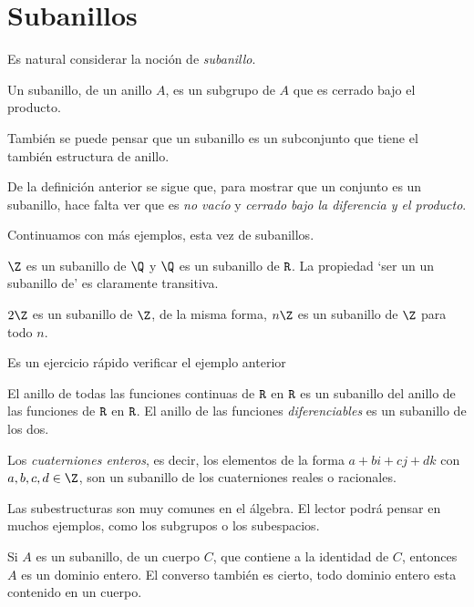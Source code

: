 \section{Subanillos}
\noindent Es natural considerar la noción de \textit{subanillo}. 

\begin{defi}[subanillo] 
	Un subanillo, de un anillo $A$, es un subgrupo de $A$ que es cerrado bajo el producto. 
\end{defi}
\begin{nota}
	También se puede pensar que un subanillo es un subconjunto que tiene el también estructura de anillo.
\end{nota}
%
De la definición anterior se sigue que, para mostrar que un conjunto es un subanillo, hace falta ver que es \textit{no vacío} y \textit{cerrado bajo la diferencia y el producto}.

Continuamos con más ejemplos, esta vez de subanillos.
\begin{ejem}
	$\Z$ es un subanillo de $\Q$ y $\Q$ es un subanillo de $\texttt{R}$. La propiedad `ser un un subanillo de' es claramente transitiva.
\end{ejem} 
\begin{ejem} 
	$2\Z$ es un subanillo de $\Z$, de la misma forma, $n\Z$ es un sub\-anillo de $\Z$ para todo $n$.
\end{ejem}
\begin{nota}
	Es un ejercicio rápido verificar el ejemplo anterior
\end{nota} 
\begin{ejem}
	El anillo de todas las funciones continuas de $\texttt{R}$ en $\texttt{R}$ es un sub\-anillo del anillo de las funciones de $\texttt{R}$ en $\texttt{R}$. El anillo de las funciones \textit{diferenciables} es un subanillo de los dos.
\end{ejem} 
\begin{ejem}
	Los \textit{cuaterniones enteros}, es decir, los elementos de la forma $a+bi+cj+dk$ con $a,b,c,d \in \Z$, son un subanillo de los cuaterniones reales o racionales.
\end{ejem}
\begin{nota}
	Las subestructuras son muy comunes en el álgebra. El lector podrá pensar en muchos ejemplos, como los subgrupos o los subespacios.
\end{nota}
\begin{ejem}
	Si $A$ es un subanillo, de un cuerpo $C$, que contiene a la identidad de $C$, entonces $A$ es un dominio entero. El converso también es cierto, todo dominio entero esta contenido en un cuerpo.
\end{ejem} 
